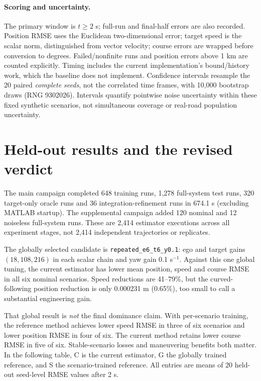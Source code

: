 \documentclass[11pt]{article}
\begin{document}
\paragraph{Scoring and uncertainty.}
The primary window is $t\ge2$ s; full-run and final-half errors are also
recorded. Position RMSE uses the Euclidean two-dimensional error; target
speed is the scalar norm, distinguished from vector velocity; course errors
are wrapped before conversion to degrees. Failed/nonfinite runs and position
errors above 1 km are counted explicitly. Timing includes the current
implementation's bound/history work, which the baseline does not implement.
Confidence intervals resample the 20 paired \emph{complete seeds}, not the
correlated time frames, with 10,000 bootstrap draws (RNG 9302026).
Intervals quantify pointwise noise uncertainty within these fixed synthetic
scenarios, not simultaneous coverage or real-road population uncertainty.


\section{Held-out results and the revised verdict}
The main campaign completed 648 training runs, 1,278 full-system test runs,
320 target-only oracle runs and 36 integration-refinement runs in 674.1 s
(excluding MATLAB startup). The supplemental campaign added 120 nominal and
12 noiseless full-system runs. These are 2,414 estimator executions across
all experiment stages, not 2,414 independent trajectories or replicates.

The globally selected candidate is \texttt{repeated\_e6\_t6\_y0.1}:
ego and target gains $(18,108,216)$ in each scalar chain and yaw gain
0.1 s$^{-1}$. Against this one global tuning, the current estimator has
lower mean position, speed and course RMSE in all six nominal scenarios.
Speed reductions are 41--79\%, but the curved-following position reduction
is only 0.000231 m (0.65\%), too small to call a substantial engineering gain.

That global result is \emph{not} the final dominance claim. With per-scenario
training, the reference method achieves lower speed RMSE in three of six
scenarios and lower position RMSE in four of six. The current method retains
lower course RMSE in five of six. Stable-scenario losses and maneuvering
benefits both matter. In the following table, C is the current estimator,
G the globally trained reference, and S the scenario-trained reference.
All entries are means of 20 held-out seed-level RMSE values after 2 s.
\end{document}
